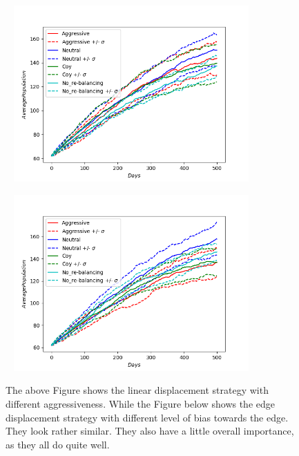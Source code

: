 \begin{figure}[!htb]
	\hspace*{-0.7cm}\
	\centering
	\includegraphics[width=9cm]{images/histories_linear.png}
	\label{fig:linear}
	\hspace*{2mm} 
\end{figure}
\vspace*{-1cm}
\begin{figure}[!htb]
	\hspace*{-0.7cm}\
	\centering
	\includegraphics[width=9cm]{images/histories_edge.png}
	\caption{ The above Figure shows the linear displacement strategy with different aggressiveness. While the Figure below shows the edge displacement strategy with different level of bias towards the edge. They look rather similar. They also have a little overall importance, as they all do quite well.
	}
	\label{fig:edge}
	\hspace*{2mm} 
\end{figure}

